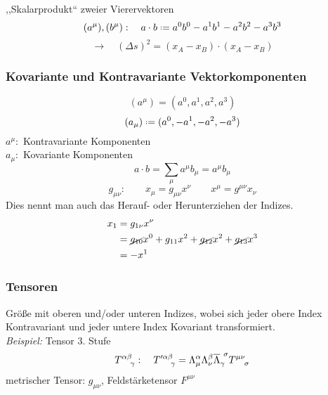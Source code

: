 ,,Skalarprodukt`` zweier Vierervektoren
\begin{equation*}
(a^{\mu}), (b^{\mu}) : \quad a \cdot b \defeq a^0 b^0 - a^1 b^1 - a^2 b^2 - a^3 b^3
\end{equation*}
\begin{equation*}
\rightarrow \quad (\Delta s)^2 = (x_A - x_B) \cdot (x_A - x_B)
\end{equation*}

\subsubsection{Kovariante und Kontravariante Vektorkomponenten}

\begin{equation*}
(a^{\mu}) = (a^0, a^1, a^2, a^3)
\end{equation*}
\begin{equation*}
(a_{\mu}) \defeq (a^0, -a^1, -a^2, -a^3)
\end{equation*}
$ a^{\mu} : $ Kontravariante Komponenten\\
$ a_{\mu} : $ Kovariante Komponenten
\begin{equation*}
a \cdot b = \sum_{\mu} a^{\mu} b_{\mu} = a^{\mu} b_{\mu}
\end{equation*}
$$ g_{\mu \nu} : \qquad x_{\mu} = g_{\mu \nu} x^{\nu} \qquad x^{\mu} = g^{\mu \nu} x_{\nu} $$
Dies nennt man auch das Herauf- oder Herunterziehen der Indizes.
\begin{align*}
x_1 &= g_{1 \nu} x^\nu\\
&= \cancel{g_{10}}x^0 + g_{11} x^2 + \cancel{g_{12}}x^2 + \cancel{g_{13}}x^3\\
&= - x^1
\end{align*}

\subsubsection{Tensoren}

Größe mit oberen und/oder unteren Indizes, wobei sich jeder obere Index Kontravariant und jeder untere Index Kovariant transformiert.\\[5pt]
\emph{Beispiel:} Tensor 3. Stufe
$$ T^{\alpha \beta}_{\ \ \ \gamma} : \quad T'^{\alpha \beta}_{\ \ \ \: \gamma} = \Lambda^{\alpha}_{\mu} \Lambda^{\beta}_{\nu} \ol{\Lambda}_{\gamma} ^{\ \sigma} T^{\mu \nu}_{\ \ \ \sigma} $$
metrischer Tensor: $ g_{\mu \nu} $, Feldstärketensor $ F^{\mu \nu} $
%
%
%
%
%
%

